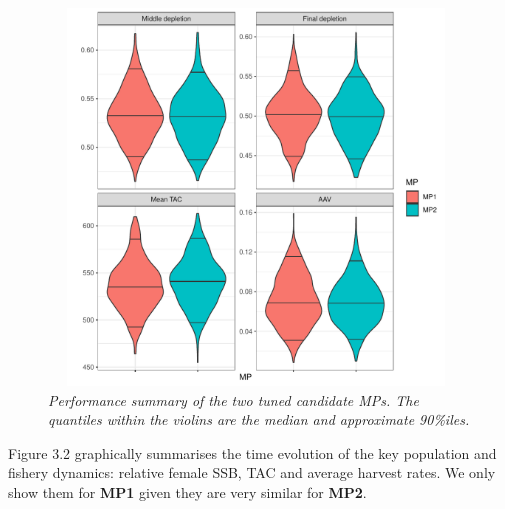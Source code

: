 \documentclass[12pt,a4paper,twoside,times,sky,standard]{csiroreport2017}
\begin{document}
\begin{figure}[hb]
    \begin{center}
        \includegraphics[width=11cm,height=10cm]{figs/fixedh_mpcomp.pdf}
    \end{center}
    \caption{\textit{Performance summary of the two tuned candidate MPs. The quantiles within the violins are the median and approximate 90\%iles.}}
\end{figure}

Figure 3.2 graphically summarises the time evolution of the key population and fishery dynamics: relative female SSB, TAC and average harvest rates. We only show them for \textbf{MP1} given they are very similar for \textbf{MP2}.
\end{document}
